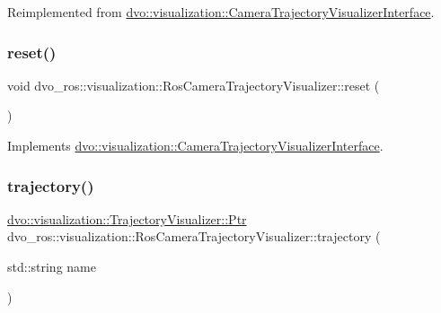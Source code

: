 Reimplemented from \mbox{\hyperlink{classdvo_1_1visualization_1_1_camera_trajectory_visualizer_interface_aa034546bfbdfa55855c56ab21df41b8e}{dvo\+::visualization\+::\+Camera\+Trajectory\+Visualizer\+Interface}}.

\mbox{\label{classdvo__ros_1_1visualization_1_1_ros_camera_trajectory_visualizer_a1900ce8a2c17014fef1a4375d8fd6e92}} 
\subsubsection{\texorpdfstring{reset()}{reset()}}
{\footnotesize\ttfamily void dvo\+\_\+ros\+::visualization\+::\+Ros\+Camera\+Trajectory\+Visualizer\+::reset (\begin{DoxyParamCaption}{ }\end{DoxyParamCaption})\hspace{0.3cm}{\ttfamily [virtual]}}



Implements \mbox{\hyperlink{classdvo_1_1visualization_1_1_camera_trajectory_visualizer_interface_abcc7ddffc30b41eb9112c386f3e41aa7}{dvo\+::visualization\+::\+Camera\+Trajectory\+Visualizer\+Interface}}.

\mbox{\label{classdvo__ros_1_1visualization_1_1_ros_camera_trajectory_visualizer_a3a015885211d1dfac2441ab5f0e26af5}} 
\subsubsection{\texorpdfstring{trajectory()}{trajectory()}}
{\footnotesize\ttfamily \mbox{\hyperlink{classdvo_1_1visualization_1_1_trajectory_visualizer_aac33ef5979fe64ee33409f1afa977fd3}{dvo\+::visualization\+::\+Trajectory\+Visualizer\+::\+Ptr}} dvo\+\_\+ros\+::visualization\+::\+Ros\+Camera\+Trajectory\+Visualizer\+::trajectory (\begin{DoxyParamCaption}\item[{std\+::string}]{name }\end{DoxyParamCaption})\hspace{0.3cm}{\ttfamily [virtual]}}



